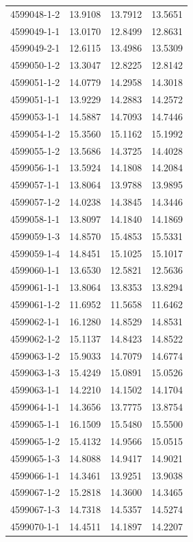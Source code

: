\begin{longtable}{lrrr}
4599048-1-2 & 13.9108 & 13.7912 & 13.5651 \\
4599049-1-1 & 13.0170 & 12.8499 & 12.8631 \\
4599049-2-1 & 12.6115 & 13.4986 & 13.5309 \\
4599050-1-2 & 13.3047 & 12.8225 & 12.8142 \\
4599051-1-2 & 14.0779 & 14.2958 & 14.3018 \\
4599051-1-1 & 13.9229 & 14.2883 & 14.2572 \\
4599053-1-1 & 14.5887 & 14.7093 & 14.7446 \\
4599054-1-2 & 15.3560 & 15.1162 & 15.1992 \\
4599055-1-2 & 13.5686 & 14.3725 & 14.4028 \\
4599056-1-1 & 13.5924 & 14.1808 & 14.2084 \\
4599057-1-1 & 13.8064 & 13.9788 & 13.9895 \\
4599057-1-2 & 14.0238 & 14.3845 & 14.3446 \\
4599058-1-1 & 13.8097 & 14.1840 & 14.1869 \\
4599059-1-3 & 14.8570 & 15.4853 & 15.5331 \\
4599059-1-4 & 14.8451 & 15.1025 & 15.1017 \\
4599060-1-1 & 13.6530 & 12.5821 & 12.5636 \\
4599061-1-1 & 13.8064 & 13.8353 & 13.8294 \\
4599061-1-2 & 11.6952 & 11.5658 & 11.6462 \\
4599062-1-1 & 16.1280 & 14.8529 & 14.8531 \\
4599062-1-2 & 15.1137 & 14.8423 & 14.8522 \\
4599063-1-2 & 15.9033 & 14.7079 & 14.6774 \\
4599063-1-3 & 15.4249 & 15.0891 & 15.0526 \\
4599063-1-1 & 14.2210 & 14.1502 & 14.1704 \\
4599064-1-1 & 14.3656 & 13.7775 & 13.8754 \\
4599065-1-1 & 16.1509 & 15.5480 & 15.5500 \\
4599065-1-2 & 15.4132 & 14.9566 & 15.0515 \\
4599065-1-3 & 14.8088 & 14.9417 & 14.9021 \\
4599066-1-1 & 14.3461 & 13.9251 & 13.9038 \\
4599067-1-2 & 15.2818 & 14.3600 & 14.3465 \\
4599067-1-3 & 14.7318 & 14.5357 & 14.5274 \\
4599070-1-1 & 14.4511 & 14.1897 & 14.2207 \\

\end{longtable}
